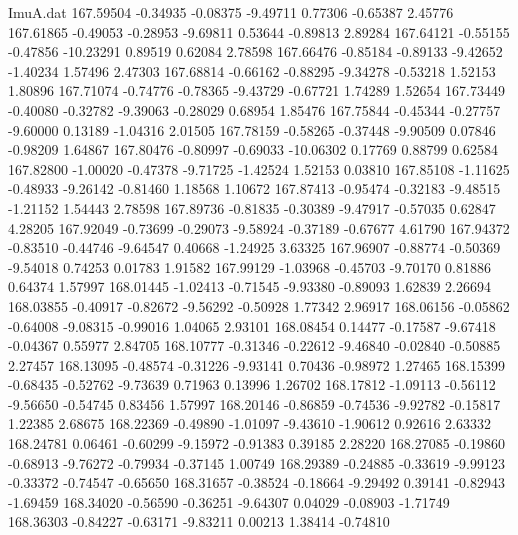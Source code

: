 \begin{filecontents}{ImuA.dat}
 167.59504   -0.34935   -0.08375   -9.49711    0.77306   -0.65387    2.45776
 167.61865   -0.49053   -0.28953   -9.69811    0.53644   -0.89813    2.89284
 167.64121   -0.55155   -0.47856  -10.23291    0.89519    0.62084    2.78598
 167.66476   -0.85184   -0.89133   -9.42652   -1.40234    1.57496    2.47303
 167.68814   -0.66162   -0.88295   -9.34278   -0.53218    1.52153    1.80896
 167.71074   -0.74776   -0.78365   -9.43729   -0.67721    1.74289    1.52654
 167.73449   -0.40080   -0.32782   -9.39063   -0.28029    0.68954    1.85476
 167.75844   -0.45344   -0.27757   -9.60000    0.13189   -1.04316    2.01505
 167.78159   -0.58265   -0.37448   -9.90509    0.07846   -0.98209    1.64867
 167.80476   -0.80997   -0.69033  -10.06302    0.17769    0.88799    0.62584
 167.82800   -1.00020   -0.47378   -9.71725   -1.42524    1.52153    0.03810
 167.85108   -1.11625   -0.48933   -9.26142   -0.81460    1.18568    1.10672
 167.87413   -0.95474   -0.32183   -9.48515   -1.21152    1.54443    2.78598
 167.89736   -0.81835   -0.30389   -9.47917   -0.57035    0.62847    4.28205
 167.92049   -0.73699   -0.29073   -9.58924   -0.37189   -0.67677    4.61790
 167.94372   -0.83510   -0.44746   -9.64547    0.40668   -1.24925    3.63325
 167.96907   -0.88774   -0.50369   -9.54018    0.74253    0.01783    1.91582
 167.99129   -1.03968   -0.45703   -9.70170    0.81886    0.64374    1.57997
 168.01445   -1.02413   -0.71545   -9.93380   -0.89093    1.62839    2.26694
 168.03855   -0.40917   -0.82672   -9.56292   -0.50928    1.77342    2.96917
 168.06156   -0.05862   -0.64008   -9.08315   -0.99016    1.04065    2.93101
 168.08454    0.14477   -0.17587   -9.67418   -0.04367    0.55977    2.84705
 168.10777   -0.31346   -0.22612   -9.46840   -0.02840   -0.50885    2.27457
 168.13095   -0.48574   -0.31226   -9.93141    0.70436   -0.98972    1.27465
 168.15399   -0.68435   -0.52762   -9.73639    0.71963    0.13996    1.26702
 168.17812   -1.09113   -0.56112   -9.56650   -0.54745    0.83456    1.57997
 168.20146   -0.86859   -0.74536   -9.92782   -0.15817    1.22385    2.68675
 168.22369   -0.49890   -1.01097   -9.43610   -1.90612    0.92616    2.63332
 168.24781    0.06461   -0.60299   -9.15972   -0.91383    0.39185    2.28220
 168.27085   -0.19860   -0.68913   -9.76272   -0.79934   -0.37145    1.00749
 168.29389   -0.24885   -0.33619   -9.99123   -0.33372   -0.74547   -0.65650
 168.31657   -0.38524   -0.18664   -9.29492    0.39141   -0.82943   -1.69459
 168.34020   -0.56590   -0.36251   -9.64307    0.04029   -0.08903   -1.71749
 168.36303   -0.84227   -0.63171   -9.83211    0.00213    1.38414   -0.74810

\end{filecontents}
